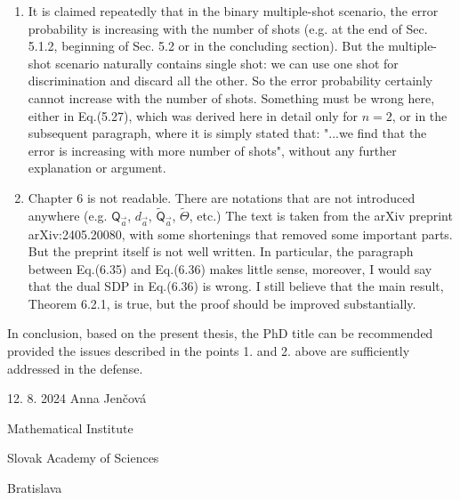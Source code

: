 \documentclass[12pt]{article}
\begin{document}
\begin{enumerate}
\item It is claimed repeatedly that in the binary multiple-shot scenario, the error
probability is increasing with the number of shots (e.g. at the end of Sec. 5.1.2,
beginning of Sec. 5.2 or in the concluding section). But the multiple-shot scenario naturally
contains single shot: we can use one shot for discrimination and discard all the other. So
the error probability certainly cannot increase with the number of shots. Something must
be wrong here, either in Eq.(5.27), which was derived here in detail only for $n=2$, or in the
subsequent paragraph, where it is simply stated that: "...we find that the error is
increasing with more number of shots", without any further explanation or argument.

\item Chapter 6 is not readable. There are notations that are
not introduced anywhere (e.g. $\mathsf{Q}_{\vec{a}}$, $d_{\vec{a}}$,
$\tilde{\mathsf{Q}}_{\vec{a}}$, $\tilde \Theta$, etc.) 
The text is taken from the arXiv preprint arXiv:2405.20080, with some shortenings that
removed some important parts. But the preprint itself is not well written. In particular,
the paragraph between Eq.(6.35) and Eq.(6.36) makes little sense, moreover, I would say
that the dual SDP in Eq.(6.36) is wrong. I still believe that the main result, Theorem
6.2.1, is true, but the proof should be improved substantially.



\end{enumerate}


In conclusion, based on the present thesis, the PhD title can be recommended provided the
issues described in the points 1. and 2. above are sufficiently addressed in the defense.



\vfill

12. 8. 2024            \hfill                                              Anna Jen\v
cov\'a

\hfill Mathematical Institute

\hfill Slovak Academy of Sciences

\hfill Bratislava


 
\end{document}
